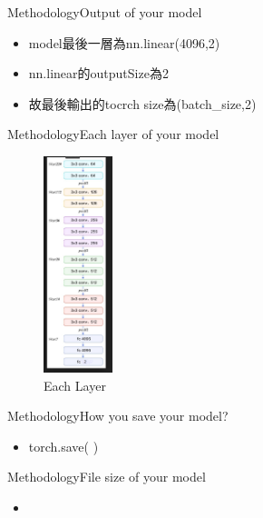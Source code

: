 \documentclass{beamer}
\begin{document}
\begin{frame}{Methodology}{Output of your model }
\begin{CJK*}{UTF8}{bsmi}
  \begin{itemize}
  \item {
model最後一層為nn.linear(4096,2)
  }
 \item {
nn.linear的outputSize為2
  }
 \item {
故最後輸出的tocrch size為(batch\_size,2)
  }
  \end{itemize}
\end{CJK*}
\end{frame}

\begin{frame}{Methodology}{Each layer of your model}
\begin{CJK*}{UTF8}{bsmi}
\begin{figure}[h]
\begin{center}
\includegraphics[width=2cm]{Layer.jpg} 
\end{center} 
\label{fig:2} 
\caption{Each Layer} 
\end{figure}
\end{CJK*}
\end{frame}

\begin{frame}{Methodology}{How you save your model?}
\begin{CJK*}{UTF8}{bsmi}
  \begin{itemize}
  \item {
torch.save( )\\
  }
  \end{itemize}
\end{CJK*}  
\end{frame}

\begin{frame}{Methodology}{File size of your model }
\begin{CJK*}{UTF8}{bsmi}
  \begin{itemize}
  \item {
  }
  \end{itemize}
\end{CJK*}
\end{frame}
\end{document}
